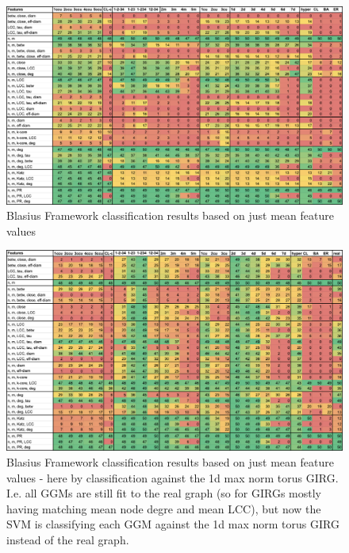 \begin{figure}
    \centering
    \includegraphics[width=\textwidth]{./figures/blasius_framework_means.png}
    \caption{Blasius Framework classification results based on just mean feature values}
    \label{fig:blasius_framework_means}
\end{figure}


\begin{figure}
    \centering
    \includegraphics[width=\textwidth]{./figures/blasius_framework_means_1d_base.png}
    \caption{Blasius Framework classification results based on just mean feature values -  here by classification against the 1d max norm torus GIRG. I.e. all GGMs are still fit to the real graph (so for GIRGs mostly having matching mean node degre and mean LCC), but now the SVM is classifying each GGM against the 1d max norm torus GIRG instead of the real graph.}
    \label{fig:blasius_framework_means_1d_base}
\end{figure}